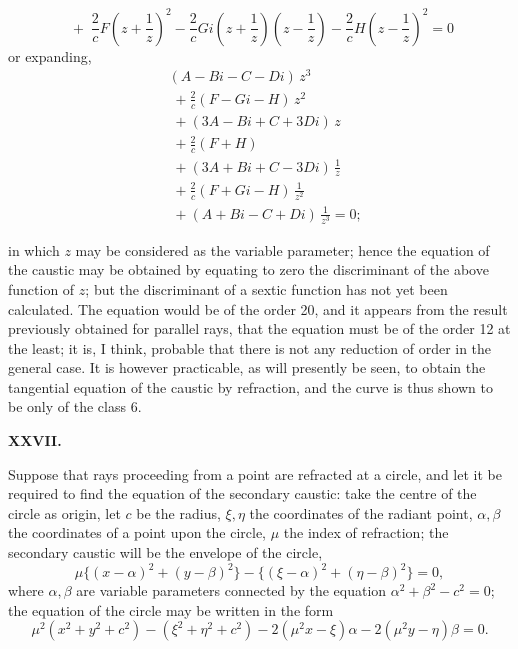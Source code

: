 \documentclass[11pt]{article}
\begin{document}
\[
\;+\; \frac{2}{c} F\!\left(z + \frac{1}{z}\right)^2 - \frac{2}{c} Gi\!\left(z + \frac{1}{z}\right)\!\left(z - \frac{1}{z}\right) - \frac{2}{c} H\!\left(z - \frac{1}{z}\right)^2 = 0
\]
or expanding,
\begin{align*}
&(A - Bi - C - Di)\,z^3 \\
&\;+ \tfrac{2}{c}(F - Gi - H)\,z^2 \\
&\;+ (3A - Bi + C + 3Di)\,z \\
&\;+ \tfrac{2}{c}(F + H) \\
&\;+ (3A + Bi + C - 3Di)\,\tfrac{1}{z} \\
&\;+ \tfrac{2}{c}(F + Gi - H)\,\tfrac{1}{z^2} \\
&\;+ (A + Bi - C + Di)\,\tfrac{1}{z^3} = 0;
\end{align*}

\newpage

\noindent in which $z$ may be considered as the variable parameter; hence the equation of the caustic may be obtained by equating to zero the discriminant of the above function of $z$; but the discriminant of a sextic function has not yet been calculated. The equation would be of the order 20, and it appears from the result previously obtained for parallel rays, that the equation must be of the order 12 at the least; it is, I think, probable that there is not any reduction of order in the general case. It is however practicable, as will presently be seen, to obtain the tangential equation of the caustic by refraction, and the curve is thus shown to be only of the class 6.

\bigskip
\begin{center}\textbf{XXVII.}\end{center}
Suppose that rays proceeding from a point are refracted at a circle, and let it be required to find the equation of the secondary caustic: take the centre of the circle as origin, let $c$ be the radius, $\xi,\eta$ the coordinates of the radiant point, $\alpha,\beta$ the coordinates of a point upon the circle, $\mu$ the index of refraction; the secondary caustic will be the envelope of the circle,
\[
\mu\{(x-\alpha)^2 + (y-\beta)^2\} - \{(\xi-\alpha)^2 + (\eta-\beta)^2\} = 0,
\]
where $\alpha,\beta$ are variable parameters connected by the equation $\alpha^2 + \beta^2 - c^2 = 0$; the equation of the circle may be written in the form
\[
\mu^2(x^2 + y^2 + c^2) - (\xi^2 + \eta^2 + c^2) - 2(\mu^2 x - \xi)\alpha - 2(\mu^2 y - \eta)\beta = 0.
\]
\end{document}
